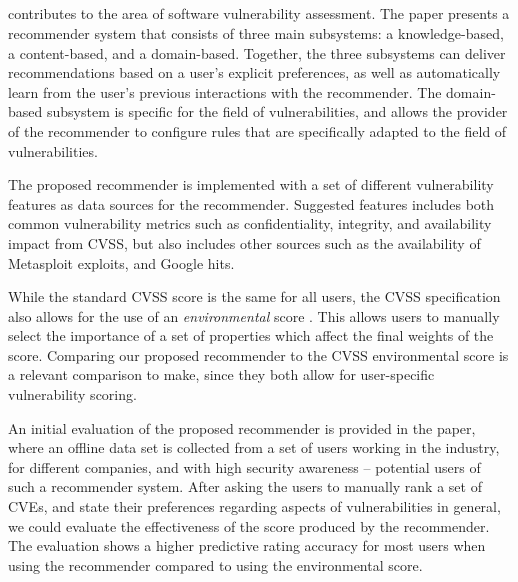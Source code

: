 \subsection{\paperIVtitle}

 contributes to the area of software vulnerability assessment.
The paper presents a recommender system that consists of three main subsystems: a knowledge-based, a content-based, and a domain-based.
Together, the three subsystems can deliver recommendations based on a user's explicit preferences, as well as automatically learn from the user's previous interactions with the recommender.
The domain-based subsystem is specific for the field of vulnerabilities, and allows the provider of the recommender to configure rules that are specifically adapted to the field of vulnerabilities.

The proposed recommender is implemented with a set of different vulnerability features as data sources for the recommender.
Suggested features includes both common vulnerability metrics such as confidentiality, integrity, and availability impact from CVSS, but also includes other sources such as the availability of Metasploit exploits, and Google hits.

While the standard CVSS score is the same for all users, the CVSS specification also allows for the use of an \emph{environmental} score \cite{cvss2spec,cvss3spec}.
This allows users to manually select the importance of a set of properties which affect the final weights of the score.
Comparing our proposed recommender to the CVSS environmental score is a relevant comparison to make, since they both allow for user-specific vulnerability scoring.

An initial evaluation of the proposed recommender is provided in the paper, where an offline data set is collected from a set of users working in the industry, for different companies, and with high security awareness -- potential users of such a recommender system.
After asking the users to manually rank a set of CVEs, and state their preferences regarding aspects of vulnerabilities in general, we could evaluate the effectiveness of the score produced by the recommender.
The evaluation shows a higher predictive rating accuracy for most users when using the recommender compared to using the environmental score.

\subsection{\paperVtitle}

